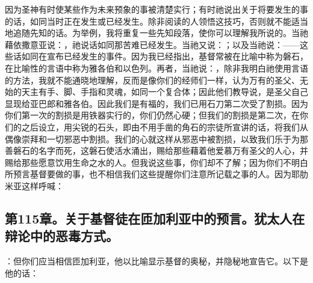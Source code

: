 因为圣神有时使某些作为未来预象的事被清楚实行；有时祂说出关于将要发生的事的话，如同当时正在发生或已经发生。除非阅读的人领悟这技巧，否则就不能适当地追随先知的话。为举例，我将重复一些先知段落，使你可以理解我所说的。当祂藉依撒意亚说：，祂说话如同那苦难已经发生。当祂又说：；以及当祂说：——这些话如同在宣布已经发生的事件。因为我已经指出，基督常被在比喻中称为磐石，在比喻性的言语中称为雅各伯和以色列。再者，当祂说：，除非我明白祂使用言语的方法，我就不能通晓地理解，反而是像你们的经师们一样，认为万有的圣父、无始的天主有手、脚、手指和灵魂，如同一个复合体；因此他们教导说，是圣父自己显现给亚巴郎和雅各伯。因此我们是有福的，我们已用石刀第二次受了割损。因为你们第一次的割损是用铁器实行的，你们仍然心硬；但我们的割损是第二次，在你们的之后设立，用尖锐的石头，即由不用手凿的角石的宗徒所宣讲的话，将我们从偶像崇拜和一切邪恶中割损。我们的心就这样从邪恶中被割损，以致我们乐于为那善磐石的名字而死，这磐石使活水涌出，赐给那些藉着他爱慕万有圣父的人心，并赐给那些愿意饮用生命之水的人。但我说这些事，你们却不了解；因为你们不明白所预言基督要做的事，也不相信我们这些提醒你们注意所记载之事的人。因为耶肋米亚这样呼喊：\par


\subsection{第115章。关于基督徒在匝加利亚中的预言。犹太人在辩论中的恶毒方式。}

：但你们应当相信匝加利亚，他以比喻显示基督的奥秘，并隐秘地宣告它。以下是他的话：\par

